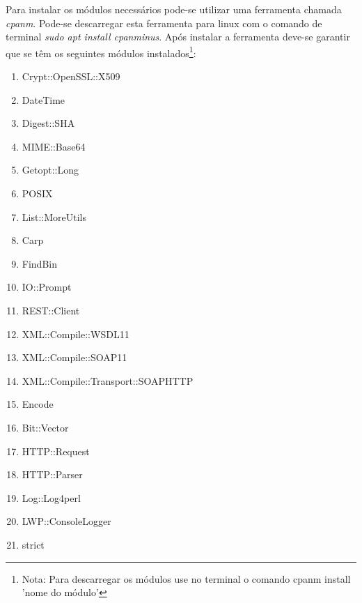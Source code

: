 Para instalar os módulos necessários pode-se utilizar uma ferramenta chamada \textit{cpanm}. Pode-se descarregar esta ferramenta para linux com o comando de terminal \textit{sudo apt install cpanminus}.\newline
Após instalar a ferramenta deve-se garantir que se têm os seguintes módulos instalados\footnote{Nota: Para descarregar os módulos use no terminal o comando cpanm install 'nome do módulo'}:

\begin{enumerate}
	\item Crypt::OpenSSL::X509
	\item DateTime
	\item Digest::SHA
	\item MIME::Base64
	\item Getopt::Long
	\item POSIX
	\item List::MoreUtils
	\item Carp
	\item FindBin
	\item IO::Prompt
	\item REST::Client
	\item XML::Compile::WSDL11
	\item XML::Compile::SOAP11
	\item XML::Compile::Transport::SOAPHTTP
	\item Encode
	\item Bit::Vector
	\item HTTP::Request
	\item HTTP::Parser
	\item Log::Log4perl
	\item LWP::ConsoleLogger
	\item strict
\end{enumerate}